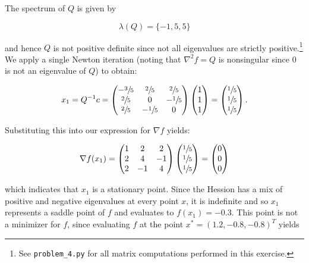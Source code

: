 \begin{solution}
    The spectrum of $Q$ is given by 

    $$
    \lambda(Q) = \{ -1, 5, 5 \}
    $$

    and hence $Q$ is not positive definite since not all eigenvalues are strictly positive.\footnote{
        See \texttt{problem\_4.py} for all matrix computations performed in this exercise.
    } We apply a single Newton iteration (noting that $\nabla^2 f = Q$ is nonsingular since 0 is not an eigenvalue of 
    $Q$) to obtain:

    $$
    x_1 = Q^{-1} c = \begin{pmatrix}
        -\sfrac{3}{5} &  \sfrac{2}{5} &  \sfrac{2}{5} \\
         \sfrac{2}{5} &  0            & -\sfrac{1}{5} \\
         \sfrac{2}{5} & -\sfrac{1}{5} &  0            \\
    \end{pmatrix} \begin{pmatrix}
        1 \\
        1 \\
        1
    \end{pmatrix} = \begin{pmatrix}
        \sfrac{1}{5} \\
        \sfrac{1}{5} \\
        \sfrac{1}{5}
    \end{pmatrix}.
    $$

    Substituting this into our expression for $\nabla f$ yields:

    $$
    \nabla f(x_1) = \begin{pmatrix}
        1 &  2 &  2 \\
        2 &  4 & -1 \\
        2 & -1 & 4
    \end{pmatrix} \begin{pmatrix}
        \sfrac{1}{5} \\
        \sfrac{1}{5} \\
        \sfrac{1}{5}
    \end{pmatrix} = \begin{pmatrix}
        0 \\
        0 \\
        0
    \end{pmatrix}
    $$

    which indicates that $x_1$ is a stationary point. Since the Hession has a mix of positive and negative eigenvalues
    at every point $x$, it is indefinite and so $x_1$ represents a saddle point of $f$ and evaluates to 
    $f(x_1) = -0.3$. This point is not a minimizer for $f$, since evaluating $f$ at the point 
    $x^* = (1.2, -0.8, -0.8 )^T$ yields 
    

\end{solution}
